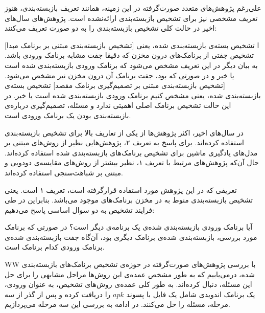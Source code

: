 علی‌رغم پژوهش‌های متعدد صورت‌گرفته در این زمینه، همانند تعریف بازبسته‌بندی، هنوز تعریف مشخصی نیز برای تشخیص بازبسته‌بندی ارائه‌نشده‌ است. پژوهش‌های سال‌های اخیر در حالت کلی تشخیص بازبسته‌بندی را به دو صورت تعریف می‌کنند:‌



[تشخیص بازبسته‌بندی مبتنی بر برنامک مبدا]
ا\label{tarif1} تشخیص بسته‌ی بازبسته‌بندی شده، یعنی تشخیص جفتی از برنامک‌های درون مخزن که دقیقا جفت مشابه برنامک ورودی باشد. به بیان دیگر در این تعریف مشخص می‌شود که برنامک ورودی بازبسته‌بندی شده است یا خیر و در صورتی که بود، جفت برنامک آن درون مخزن نیز مشخص می‌شود.
[تشخیص بازبسته‌بندی مبتنی بر تصمیم‌گیری برنامک مقصد]
\label{tarif2} تشخیص بسته‌ی بازبسته‌بندی شده، یعنی مشخص کنیم برنامک ورودی بازبسته‌بندی شده است یا خیر. در این حالت تشخیص برنامک اصلی اهمیتی ندارد و مسئله، تصمیم‌گیری  درباره‌ی بازبسته‌بندی بودن یک برنامک ورودی است.






در سال‌های اخیر، اکثر پژوهش‌ها از یکی از تعاریف بالا برای تشخیص بازبسته‌بندی استفاده کرده‌اند. برای پاسخ به تعریف ۲، پژوهش‌هایی نظیر  از روش‌های مبتنی بر مدل‌های یادگیری ماشین برای تشخیص برنامک‌های بازبسته‌‌بندی شده استفاده کرده‌اند. حال آن‌که پژوهش‌های مرتبط با تعریف ۱، نظیر   بیشتر از روش‌های مقایسه‌ی دودویی و مبتنی بر شباهت‌سنجی استفاده کرده‌اند. 

تعریفی که در این پژوهش مورد استفاده قرار‌گرفته‌ است، تعریف ۱ است. یعنی تشخیص بازبسته‌بندی منوط به در مخزن برنامک‌های موجود می‌باشد. بنابراین در طی فرایند تشخیص به دو سوال اساسی پاسخ می‌دهیم:‌

 آیا برنامک ورودی بازبسته‌بندی شده‌ی یک برنامه‌ی دیگر است؟‌
 در صورتی که برنامک مورد بررسی، بازبسته‌بندی شده‌ی برنامک دیگری بود، آن‌گاه جفت بازبسته‌بندی شده‌ی برنامک ورودی کدام برنامک است.

WW
با بررسی پژوهش‌های صورت‌گرفته در حوزه‌ی تشخیص برنامک‌های بازبسته‌بندی شده، درمی‌یابیم که به طور مشخص عمده‌ی این روش‌ها مراحل مشابهی را برای حل این مسئله، دنبال کرده‌اند. به طور کلی عمده‌ی روش‌های تشخیص، به عنوان ورودی، یک برنامک اندویدی شامل یک فایل با پسوند $apk$ را دریافت کرده و پس از گذر از سه مرحله، مسئله را حل می‌کنند. در ادامه به بررسی این سه مرحله می‌پردازیم.


